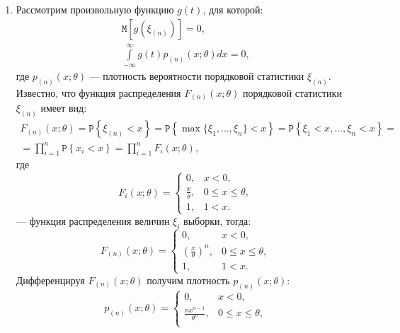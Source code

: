 \documentclass[a4paper,12pt]{article}
\newcommand{\expectation}[1]{\texttt{M} \left[ #1 \right]}
\newcommand{\probability}[1]{\texttt{P} \left \{ #1 \right\} }
\begin{document}
\begin{enumerate}
    \item Рассмотрим произвольную функцию $g(t)$, для которой:
          \begin{gather*}
              \expectation{g(\xi_{(n)})} = 0 , \\
              \int \limits_{-\infty}^{\infty} g(t) p_{(n)}(x; \theta) dx = 0 ,
          \end{gather*}
          где $p_{(n)}(x; \theta)$ --- плотность вероятности порядковой статистики $\xi_{(n)}$. Известно, что функция распределения
          $F_{(n)}(x; \theta)$ порядковой статистики $\xi_{(n)}$ имеет вид:
          \begin{multline*}
              F_{(n)}(x; \theta)
              = \probability{\xi_{(n)} < x}
              = \probability{\max \{ \xi_1, \dots, \xi_n \} < x}
              = \probability{\xi_1 < x, \dots, \xi_n < x} = \\
              = \prod_{i=1}^n \probability{x_i < x}
              = \prod_{i=1}^n F_i(x; \theta) ,
          \end{multline*}
          где
          \[
              F_i(x; \theta)
              = \left \{
              \begin{array}{ll}
                  0,                & x < 0,              \\
                  \frac{x}{\theta}, & 0 \le x \le \theta, \\
                  1,                & 1 < x .
              \end{array}
              \right .
          \]
          --- функция распределения величин $\xi_i$ выборки, тогда:
          \[
              F_{(n)}(x; \theta)
              = \left \{
              \begin{array}{ll}
                  0,                                 & x < 0,              \\
                  \left( \frac{x}{\theta} \right)^n, & 0 \le x \le \theta, \\
                  1,                                 & 1 < x .
              \end{array}
              \right .
          \]
          Дифференцируя $F_{(n)}(x; \theta)$ получим плотность $p_{(n)}(x; \theta)$:
          \[
              p_{(n)}(x; \theta)
              = \left \{
              \begin{array}{ll}
                  0,                          & x < 0,              \\
                  \frac{n x^{n-1}}{\theta^n}, & 0 \le x \le \theta, \\

\end{array}\]
\end{enumerate}
\end{document}
